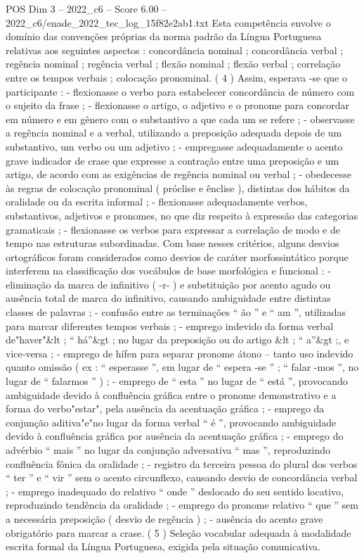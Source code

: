 \begin{textsample}{POS Dim 3 – 2022\_c6 – Score 6.00 – 2022\_c6/enade\_2022\_tec\_log\_15f82e2ab1.txt}
Esta competência envolve o domínio das convenções próprias da norma padrão da Língua Portuguesa relativas aos seguintes aspectos : concordância nominal ; concordância verbal ; regência nominal ; regência verbal ; flexão nominal ; flexão verbal ; correlação entre os tempos verbais ; colocação pronominal. ( 4 ) Assim, esperava -se que o participante : - flexionasse o verbo para estabelecer concordância de número com o sujeito da frase ; - flexionasse o artigo, o adjetivo e o pronome para concordar em número e em gênero com o substantivo a que cada um se refere ; - observasse a regência nominal e a verbal, utilizando a preposição adequada depois de um substantivo, um verbo ou um adjetivo ; - empregasse adequadamente o acento grave indicador de crase que expresse a contração entre uma preposição e um artigo, de acordo com as exigências de regência nominal ou verbal ; - obedecesse às regras de colocação pronominal ( próclise e ênclise ), distintas dos hábitos da oralidade ou da escrita informal ; - flexionasse adequadamente verbos, substantivos, adjetivos e pronomes, no que diz respeito à expressão das categorias gramaticais ; - flexionasse os verbos para expressar a correlação de modo e de tempo nas estruturas subordinadas.
Com base nesses critérios, alguns desvios ortográficos foram considerados como desvios de caráter morfossintático porque interferem na classificação dos vocábulos de base morfológica e funcional : - eliminação da marca de infinitivo ( -r- ) e substituição por acento agudo ou ausência total de marca do infinitivo, causando ambiguidade entre distintas classes de palavras ; - confusão entre as terminações “ ão ” e “ am ”, utilizadas para marcar diferentes tempos verbais ; - emprego indevido da forma verbal de"haver"\&lt ; “ há”\&gt ; no lugar da preposição ou do artigo \&lt ; “ a”\&gt ;, e vice-versa ; - emprego de hífen para separar pronome átono – tanto uso indevido quanto omissão ( ex : “ esperasse ”, em lugar de “ espera -se ” ; “ falar -mos ”, no lugar de “ falarmos ” ) ; - emprego de “ esta ” no lugar de “ está ”, provocando ambiguidade devido à confluência gráfica entre o pronome demonstrativo e a forma do verbo"estar", pela ausência da acentuação gráfica ; - emprego da conjunção aditiva"e"no lugar da forma verbal “ é ”, provocando ambiguidade devido à confluência gráfica por ausência da acentuação gráfica ; - emprego do advérbio “ mais ” no lugar da conjunção adversativa “ mas ”, reproduzindo confluência fônica da oralidade ; - registro da terceira pessoa do plural dos verbos “ ter ” e “ vir ” sem o acento circunflexo, causando desvio de concordância verbal ; - emprego inadequado do relativo “ onde ” deslocado do seu sentido locativo, reproduzindo tendência da oralidade ; - emprego do pronome relativo “ que ” sem a necessária preposição ( desvio de regência ) ; - ausência do acento grave obrigatório para marcar a crase. ( 5 ) Seleção vocabular adequada à modalidade escrita formal da Língua Portuguesa, exigida pela situação comunicativa.

\end{textsample}
